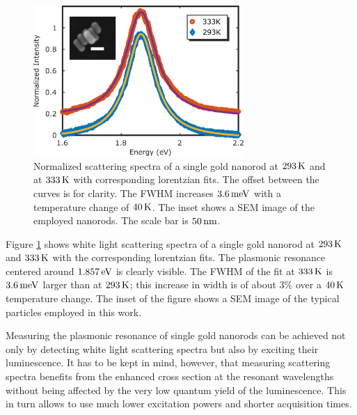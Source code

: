 \begin{figure}[htp] \centering
\includegraphics[width=8cm]{Chapters/05_WhiteLight/Figures/01_Spectra_Example/01_Spectra_Example.png}
\caption{Normalized scattering spectra of a single gold nanorod at $293\,\textrm{K}$ and
at $333\,\textrm{K}$ with corresponding lorentzian fits. The offset between the curves is for
clarity. The FWHM increases $3.6\,\textrm{meV}$ with a temperature change of $40\,\textrm{K}$. The
inset shows a SEM image of the employed nanorods. The scale bar is $50\,\textrm{nm}$.}
	\label{fig:scattering_spectra}
\end{figure}

Figure \ref{fig:scattering_spectra} shows white light scattering spectra of a single
gold nanorod at $293\,\textrm{K}$ and $333\,\textrm{K}$ with the corresponding lorentzian fits. The
plasmonic resonance centered around $1.857\,\textrm{eV}$ is clearly visible. The FWHM of
the fit at $333\,\textrm{K}$ is $3.6\,\textrm{meV}$ larger than at $293\,\textrm{K}$; this increase in width
is of about $3\%$ over a $40\,\textrm{K}$ temperature change. The inset of the figure
shows a SEM image of the typical particles employed in this work.

Measuring the plasmonic resonance of single gold nanorods can be achieved not
only by detecting white light scattering spectra but also by exciting their
luminescence\cite{Konrad2013}. It has to be kept in mind, however, that
measuring scattering spectra benefits from the enhanced cross section at the
resonant wavelengths without being affected by the very low quantum yield of the
luminescence\cite{Yorulmaz2012}. This in turn allows to use much lower
excitation powers and shorter acquisition times.

